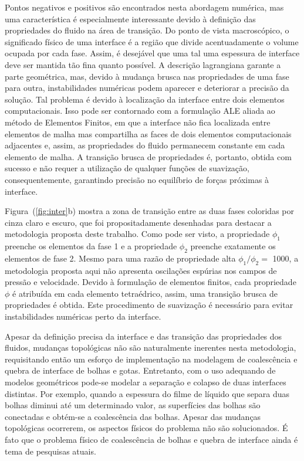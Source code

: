 \documentclass[a4paper,portuges,12pt]{article}
\begin{document}
Pontos negativos e positivos são encontrados nesta abordagem numérica,
mas uma característica é especialmente interessante devido à definição
das propriedades do fluido na área de transição. Do ponto de vista
macroscópico, o significado físico de uma interface é a região que
divide acentuadamente o volume ocupada por cada fase. Assim, é desejável
que uma tal uma espessura de interface deve ser mantida tão fina quanto
possível. A descrição lagrangiana garante a parte geométrica, mas,
devido à mudança brusca nas propriedades de uma fase para outra,
instabilidades numéricas podem aparecer e deteriorar a precisão da
solução. Tal problema é devido à localização da interface entre dois
elementos computacionais. Isso pode ser contornado com a formulação ALE
aliada ao método de Elementos Finitos, em que a interface não fica
localizada entre elementos de malha mas compartilha as faces de dois
elementos computacionais adjacentes e, assim, as propriedades do fluido
permanecem constante em cada elemento de malha. A transição brusca de
propriedades é, portanto, obtida com sucesso e não requer a utilização
de qualquer funções de suavização, consequentemente, garantindo precisão
no equilíbrio de forças próximas à interface.

Figura~(\ref{fig:inter}b) mostra a zona de transição entre as duas fases
coloridas por cinza claro e escuro, que foi propositadamente desenhadas
para destacar a metodologia proposta deste trabalho. Como pode ser
visto, a propriedade $\phi_1$ preenche os elementos da fase 1 e a
propriedade $\phi_2$ preenche exatamente os elementos de fase 2. Mesmo
para uma razão de propriedade alta $\phi_1 / \phi_2 =$ 1000, a
metodologia proposta aqui não apresenta oscilações espúrias nos campos
de pressão e velocidade. Devido à formulação de elementos finitos, cada
propriedade $\phi$ é atribuída em cada elemento tetraédrico, assim, uma
transição brusca de propriedades é obtida. Este procedimento de
suavização é necessário para evitar instabilidades numéricas perto da
interface.

Apesar da definição precisa da interface e das transição das
propriedades dos fluidos, mudanças topológicas não são naturalmente
inerentes nesta metodologia, requisitando então um esforço de
implementação na modelagem de coalescência e quebra de interface de
bolhas e gotas. Entretanto, com o uso adequando de modelos geométricos
pode-se modelar a separação e colapso de duas interfaces distintas. Por
exemplo, quando a espessura do filme de líquido que separa duas bolhas
diminui até um determinado valor, as superfícies das bolhas são
conectadas e obtém-se a coalescência das bolhas. Apesar das mudanças
topológicas ocorrerem, os aspectos físicos do problema não são
solucionados. É fato que o problema físico de coalescência de bolhas e
quebra de interface ainda é tema de pesquisas atuais.
\end{document}
